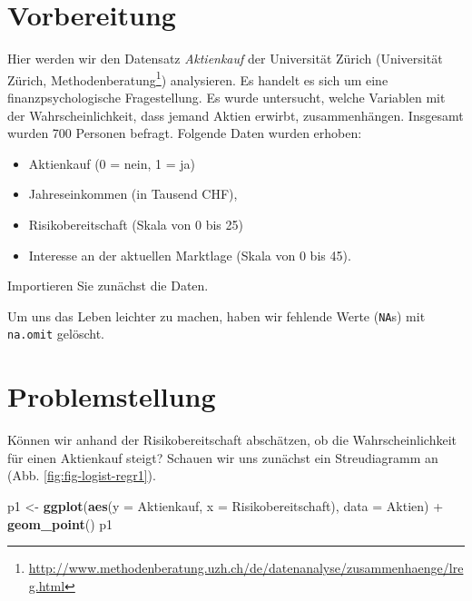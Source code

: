 \documentclass[12pt,ngerman,]{book}
\makeatletter
\newenvironment{Shaded}{\begin{snugshade}}{\end{snugshade}}
\newcommand{\KeywordTok}[1]{\textcolor[rgb]{0.13,0.29,0.53}{\textbf{{#1}}}}
\newcommand{\DataTypeTok}[1]{\textcolor[rgb]{0.13,0.29,0.53}{{#1}}}
\newcommand{\StringTok}[1]{\textcolor[rgb]{0.31,0.60,0.02}{{#1}}}
\newcommand{\NormalTok}[1]{{#1}}
\providecommand{\tightlist}{%
  \setlength{\itemsep}{0pt}\setlength{\parskip}{0pt}}
\let\rmarkdownfootnote\footnote%
\def\footnote{\protect\rmarkdownfootnote}
\renewcommand{\href}[2]{#2\footnote{\url{#1}}}
\newenvironment{kframe}{%
\medskip{}
\setlength{\fboxsep}{.8em}
 \def\at@end@of@kframe{}%
 \ifinner\ifhmode%
  \def\at@end@of@kframe{\end{minipage}}%
  \begin{minipage}{\columnwidth}%
 \fi\fi%
 \def\FrameCommand##1{\hskip\@totalleftmargin \hskip-\fboxsep
 \colorbox{shadecolor}{##1}\hskip-\fboxsep
     \hskip-\linewidth \hskip-\@totalleftmargin \hskip\columnwidth}%
 \MakeFramed {\advance\hsize-\width
   \@totalleftmargin\z@ \linewidth\hsize
   \@setminipage}}%
 {\par\unskip\endMakeFramed%
 \at@end@of@kframe}
\renewenvironment{Shaded}{\begin{kframe}}{\end{kframe}}
\theoremstyle{definition}
\theoremstyle{definition}
\theoremstyle{remark}
\makeatother
\begin{document}
\section{Vorbereitung}\label{vorbereitung}

Hier werden wir den Datensatz \emph{Aktienkauf} der Universität Zürich
(\href{http://www.methodenberatung.uzh.ch/de/datenanalyse/zusammenhaenge/lreg.html}{Universität
Zürich, Methodenberatung}) analysieren. Es handelt es sich um eine
finanzpsychologische Fragestellung. Es wurde untersucht, welche
Variablen mit der Wahrscheinlichkeit, dass jemand Aktien erwirbt,
zusammenhängen. Insgesamt wurden 700 Personen befragt. Folgende Daten
wurden erhoben:

\begin{itemize}
\tightlist
\item
  Aktienkauf (0 = nein, 1 = ja)
\item
  Jahreseinkommen (in Tausend CHF),
\item
  Risikobereitschaft (Skala von 0 bis 25)
\item
  Interesse an der aktuellen Marktlage (Skala von 0 bis 45).
\end{itemize}

Importieren Sie zunächst die Daten.

\begin{Shaded}
\end{Shaded}

Um uns das Leben leichter zu machen, haben wir fehlende Werte
(\texttt{NA}s) mit \texttt{na.omit} gelöscht.

\section{Problemstellung}\label{problemstellung}

Können wir anhand der Risikobereitschaft abschätzen, ob die
Wahrscheinlichkeit für einen Aktienkauf steigt? Schauen wir uns zunächst
ein Streudiagramm an (Abb. \ref{fig:fig-logist-regr1}).

\begin{Shaded}
\begin{Highlighting}[]
\NormalTok{p1 <-}\StringTok{ }\KeywordTok{ggplot}\NormalTok{(}\KeywordTok{aes}\NormalTok{(}\DataTypeTok{y =} \NormalTok{Aktienkauf, }\DataTypeTok{x =} \NormalTok{Risikobereitschaft), }\DataTypeTok{data =} \NormalTok{Aktien) +}\StringTok{ }\KeywordTok{geom_point}\NormalTok{()}
\NormalTok{p1}
\end{Highlighting}
\end{Shaded}
\end{document}

